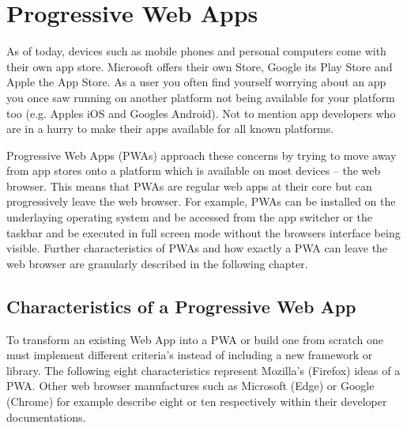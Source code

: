 \section{Progressive Web Apps}
\label{sec:theorieC}


As of today, devices such as mobile phones and personal computers come with their own app store. Microsoft offers their own Store, Google its Play Store and Apple the App Store. As a user you often find yourself worrying about an app you once saw running on another platform not being available for your platform too (e.g. Apples iOS and Googles Android). \cite[p. 3]{sheppardBeginningProgressiveWeb2017} Not to mention app developers who are in a hurry to make their apps available for all known platforms.

Progressive Web Apps (PWAs) approach these concerns by trying to move away from app stores onto a platform which is available on most devices – the web browser. This means that PWAs are regular web apps at their core but can progressively leave the web browser. For example, PWAs can be installed on the underlaying operating system and be accessed from the app switcher or the taskbar and be executed in full screen mode without the browsers interface being visible. \cite[p. 26]{liebelProgressiveWebApps2019} Further characteristics of PWAs and how exactly a PWA can leave the web browser are granularly described in the following chapter.


\subsection{Characteristics of a Progressive Web App}
\label{sec:theorieCa}


To transform an existing Web App into a PWA or build one from scratch one must implement different criteria’s instead of including a new framework or library. \cite[p. 6]{sheppardBeginningProgressiveWeb2017}
The following eight characteristics represent Mozilla’s (Firefox) ideas of a PWA. Other web browser manufactures such as Microsoft (Edge) or Google (Chrome) for example describe eight or ten respectively within their developer documentations. \cite[p. 90]{liebelProgressiveWebApps2019}\cite{ProgressiveWebApps}

